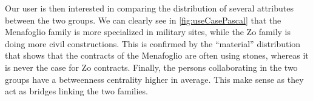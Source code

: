 Our user is then interested in comparing the distribution of several attributes between the two groups. We can clearly see in \autoref{fig:useCasePascal} that the Menafoglio family is more specialized in military sites, while the Zo family is doing more civil constructions. This is confirmed by the ``material'' distribution that shows that the contracts of the Menafoglio are often using stones, whereas it is never the case for Zo contracts. Finally, the persons collaborating in the two groups have a betweenness centrality higher in average. This make sense as they act as bridges linking the two families.











